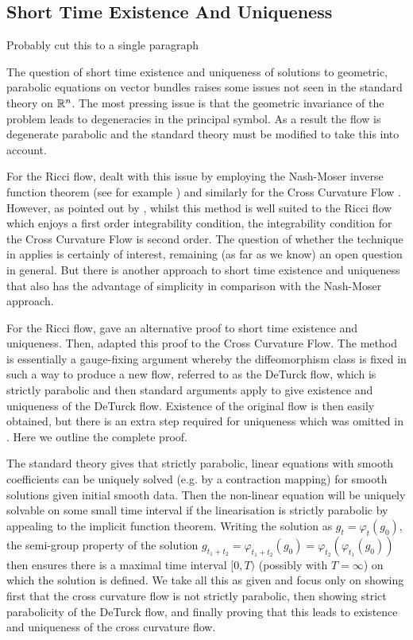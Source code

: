 \documentclass[a4paper, 12pt]{amsart}
\begin{document}
\subsection{Short Time Existence And Uniqueness}
\label{subsec:xcf_existence_uniqueness}

{\color{red} Probably cut this to a single paragraph}

The question of short time existence and uniqueness of solutions to geometric, parabolic equations on vector bundles raises some issues not seen in the standard theory on \(\mathbb{R}^n\). The most pressing issue is that the geometric invariance of the problem leads to degeneracies in the principal symbol. As a result the flow is degenerate parabolic and the standard theory must be modified to take this into account.

For the Ricci flow, \cite{Hamilton:/1982} dealt with this issue by employing the Nash-Moser inverse function theorem (see for example \cite{MR656198}) and similarly for the Cross Curvature Flow \cite{MR2055396}. However, as pointed out by \cite{MR2207496}, whilst this method is well suited to the Ricci flow which enjoys a first order integrability condition, the integrability condition for the Cross Curvature Flow is second order. The question of whether the technique in \cite{Hamilton:/1982} applies is certainly of interest, remaining (as far as we know) an open question in general. But there is another approach to short time existence and uniqueness that also has the advantage of simplicity in comparison with the Nash-Moser approach.

For the Ricci flow, \cite{MR697987} gave an alternative proof to short time existence and uniqueness. Then, \cite{MR2207496} adapted this proof to the Cross Curvature Flow. The method is essentially a gauge-fixing argument whereby the diffeomorphism class is fixed in such a way to produce a new flow, referred to as the DeTurck flow, which is strictly parabolic and then standard arguments apply to give existence and uniqueness of the DeTurck flow. Existence of the original flow is then easily obtained, but there is an extra step required for uniqueness which was omitted in \cite{MR2207496}. Here we outline the complete proof.

The standard theory gives that strictly parabolic, linear equations with smooth coefficients can be uniquely solved (e.g. by a contraction mapping) for smooth solutions given initial smooth data. Then the non-linear equation will be uniquely solvable on some small time interval if the linearisation is strictly parabolic by appealing to the implicit function theorem. Writing the solution as \(g_t = \varphi_t(g_0)\), the semi-group property of the solution \(g_{t_1 + t_2} = \varphi_{t_1 + t_2} (g_0) = \varphi_{t_2} (\varphi_{t_1} (g_0))\) then ensures there is a maximal time interval \([0, T)\) (possibly with \(T = \infty\)) on which the solution is defined. We take all this as given and focus only on showing first that the cross curvature flow is not strictly parabolic, then showing strict parabolicity of the DeTurck flow, and finally proving that this leads to existence and uniqueness of the cross curvature flow.
\end{document}

